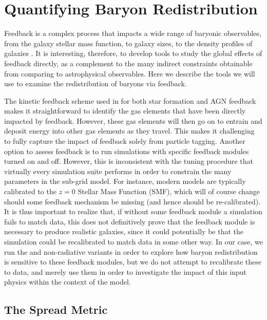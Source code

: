 \section{Quantifying Baryon Redistribution}
\label{sec:feedbackmetrics}

Feedback is a complex process that impacts a wide range of
baryonic observables, from the galaxy stellar mass function, to galaxy sizes,
to the density profiles of galaxies \citep[e.g.][]{BenitezLlambay2018}. It is
interesting, therefore, to develop tools to study the global effects of
feedback directly, as a complement to the many indirect constraints
obtainable from comparing to astrophysical observables. Here we describe the
tools we will use to examine the redistribution of baryons via feedback.

The kinetic feedback scheme used in \simba{} for both star formation and AGN
feedback makes it straightforward to identify the gas elements that have been
directly impacted by feedback. However, these gas elements will then go on to
entrain and deposit energy into other gas elements as they travel. This makes
it challenging to fully capture the impact of feedback solely from particle
tagging. Another option to assess feedback is to run simulations with
specific feedback modules turned on and off. However, this is inconsistent
with the tuning procedure that virtually every simulation suite performs in
order to constrain the many parameters in the sub-grid model. For instance,
modern models are typically calibrated to the $z=0$ Stellar Mass Function
(SMF), which will of course change should some feedback mechanism be missing
(and hence should be re-calibrated). It is thus important to realize that, if
without some feedback module a simulation fails to match data, this does not
definitively prove that the feedback module is necessary to produce realistic
galaxies, since it could potentially be that the simulation could be
recalibrated to match data in some other way. In our case, we run the \nojet{}
and non-radiative variants in order to explore how baryon redistribution is
sensitive to these feedback modules, but we do not attempt to recalibrate
these to data, and merely use them in order to investigate the impact of this
input physics within the context of the \simba{} model.


\subsection{The Spread Metric}

